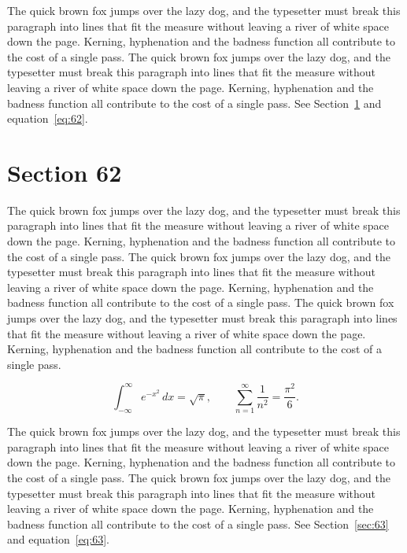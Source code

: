 \documentclass{article}
\begin{document}
The quick brown fox jumps over the lazy dog, and the typesetter must break this paragraph into lines that fit the measure without leaving a river of white space down the page. Kerning, hyphenation and the badness function all contribute to the cost of a single pass. The quick brown fox jumps over the lazy dog, and the typesetter must break this paragraph into lines that fit the measure without leaving a river of white space down the page. Kerning, hyphenation and the badness function all contribute to the cost of a single pass. 
See Section~\ref{sec:62} and equation~\eqref{eq:62}.
\section{Section 62}
\label{sec:62}
The quick brown fox jumps over the lazy dog, and the typesetter must break this paragraph into lines that fit the measure without leaving a river of white space down the page. Kerning, hyphenation and the badness function all contribute to the cost of a single pass. The quick brown fox jumps over the lazy dog, and the typesetter must break this paragraph into lines that fit the measure without leaving a river of white space down the page. Kerning, hyphenation and the badness function all contribute to the cost of a single pass. The quick brown fox jumps over the lazy dog, and the typesetter must break this paragraph into lines that fit the measure without leaving a river of white space down the page. Kerning, hyphenation and the badness function all contribute to the cost of a single pass. 

\begin{equation}\label{eq:62}
\int_{-\infty}^{\infty} e^{-x^{2}}\,dx = \sqrt{\pi}, \qquad
\sum_{n=1}^{\infty} \frac{1}{n^{2}} = \frac{\pi^{2}}{6}.
\end{equation}

The quick brown fox jumps over the lazy dog, and the typesetter must break this paragraph into lines that fit the measure without leaving a river of white space down the page. Kerning, hyphenation and the badness function all contribute to the cost of a single pass. The quick brown fox jumps over the lazy dog, and the typesetter must break this paragraph into lines that fit the measure without leaving a river of white space down the page. Kerning, hyphenation and the badness function all contribute to the cost of a single pass. 
See Section~\ref{sec:63} and equation~\eqref{eq:63}.
\end{document}
